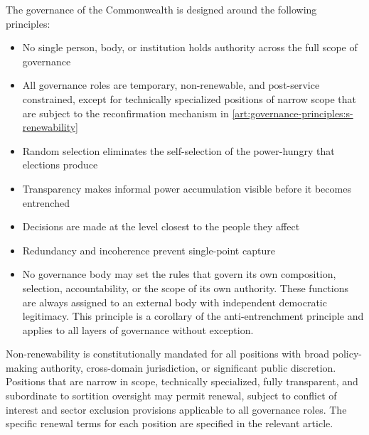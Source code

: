 


The governance of the Commonwealth is designed around the following principles:
\begin{itemize}
  \item No single person, body, or institution holds authority across the full scope of governance
  \item All governance roles are temporary, non-renewable, and post-service constrained, except for technically specialized positions of narrow scope that are subject to the reconfirmation mechanism in \ref{art:governance-principles:s-renewability}
  \item Random selection eliminates the self-selection of the power-hungry that elections produce
  \item Transparency makes informal power accumulation visible before it becomes entrenched
  \item Decisions are made at the level closest to the people they affect
  \item Redundancy and incoherence prevent single-point capture
  \item No governance body may set the rules that govern its own composition, selection, accountability, or the scope of its own authority. These functions are always assigned to an external body with independent democratic legitimacy. This principle is a corollary of the anti-entrenchment principle and applies to all layers of governance without exception.
\end{itemize}

Non-renewability is constitutionally mandated for all positions with broad policy-making authority, cross-domain jurisdiction, or significant public discretion. Positions that are narrow in scope, technically specialized, fully transparent, and subordinate to sortition oversight may permit renewal, subject to conflict of interest and sector exclusion provisions applicable to all governance roles. The specific renewal terms for each position are specified in the relevant article.

